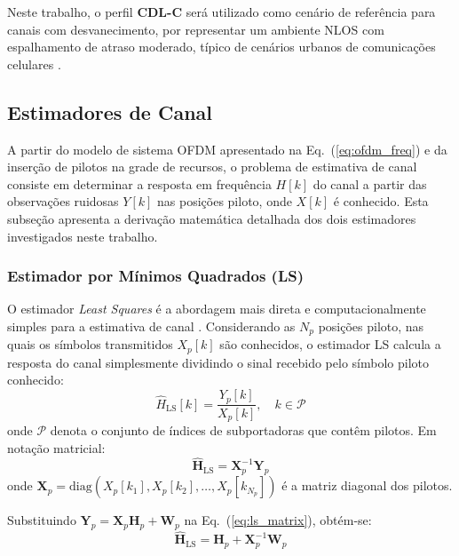 \documentclass[conference]{IEEEtran}
\begin{document}
Neste trabalho, o perfil \textbf{CDL-C} será utilizado como cenário de referência para canais com desvanecimento, por representar um ambiente NLOS com espalhamento de atraso moderado, típico de cenários urbanos de comunicações celulares \cite{3gpp38901}.

\subsection{Estimadores de Canal}

A partir do modelo de sistema OFDM apresentado na Eq.~(\ref{eq:ofdm_freq}) e da inserção de pilotos na grade de recursos, o problema de estimativa de canal consiste em determinar a resposta em frequência $H[k]$ do canal a partir das observações ruidosas $Y[k]$ nas posições piloto, onde $X[k]$ é conhecido. Esta subseção apresenta a derivação matemática detalhada dos dois estimadores investigados neste trabalho.

\subsubsection{Estimador por Mínimos Quadrados (LS)}

O estimador \textit{Least Squares} é a abordagem mais direta e computacionalmente simples para a estimativa de canal \cite{vanDeBeek1995}. Considerando as $N_p$ posições piloto, nas quais os símbolos transmitidos $X_p[k]$ são conhecidos, o estimador LS calcula a resposta do canal simplesmente dividindo o sinal recebido pelo símbolo piloto conhecido:
\begin{equation}
    \hat{H}_{\text{LS}}[k] = \frac{Y_p[k]}{X_p[k]}, \quad k \in \mathcal{P}
    \label{eq:ls}
\end{equation}
onde $\mathcal{P}$ denota o conjunto de índices de subportadoras que contêm pilotos. Em notação matricial:
\begin{equation}
    \hat{\mathbf{H}}_{\text{LS}} = \mathbf{X}_p^{-1} \mathbf{Y}_p
    \label{eq:ls_matrix}
\end{equation}
onde $\mathbf{X}_p = \text{diag}(X_p[k_1], X_p[k_2], \ldots, X_p[k_{N_p}])$ é a matriz diagonal dos pilotos.

Substituindo $\mathbf{Y}_p = \mathbf{X}_p \mathbf{H}_p + \mathbf{W}_p$ na Eq.~(\ref{eq:ls_matrix}), obtém-se:
\begin{equation}
    \hat{\mathbf{H}}_{\text{LS}} = \mathbf{H}_p + \mathbf{X}_p^{-1} \mathbf{W}_p
    \label{eq:ls_error}
\end{equation}
\end{document}
